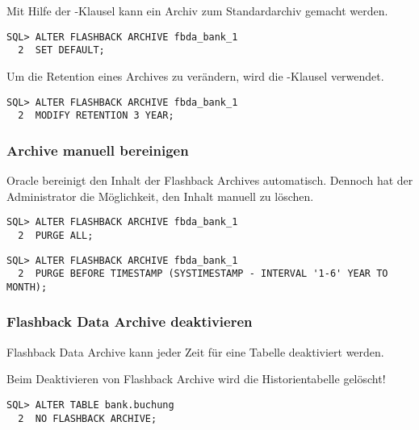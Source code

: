           Mit Hilfe der -Klausel kann ein Archiv zum Standardarchiv gemacht werden.
          \begin{lstlisting}[caption={Ein Archiv zum Standardarchiv machen},label=admin1738,language=oracle_sql]
SQL> ALTER FLASHBACK ARCHIVE fbda_bank_1
  2  SET DEFAULT;
          \end{lstlisting}
          Um die Retention eines Archives zu ver\"andern, wird die -Klausel verwendet.
          \begin{lstlisting}[caption={Die Vorhaltedauer eines Archives ver\"andern},label=admin1739,language=oracle_sql]
SQL> ALTER FLASHBACK ARCHIVE fbda_bank_1
  2  MODIFY RETENTION 3 YEAR;
          \end{lstlisting}
        \subsubsection{Archive manuell bereinigen}
          Oracle bereinigt den Inhalt der Flashback Archives automatisch. Dennoch hat der Administrator die M\"oglichkeit, den Inhalt manuell zu l\"oschen.
          \begin{lstlisting}[caption={Den gesamten Inhalt eines Archives l\"oschen},label=admin1740,language=oracle_sql]
SQL> ALTER FLASHBACK ARCHIVE fbda_bank_1
  2  PURGE ALL;
          \end{lstlisting}
          \begin{lstlisting}[caption={Alle Eintr\"age l\"oschen, die \"alter als ein Jahr und sechs Monate sind},label=admin1741,language=oracle_sql]
SQL> ALTER FLASHBACK ARCHIVE fbda_bank_1
  2  PURGE BEFORE TIMESTAMP (SYSTIMESTAMP - INTERVAL '1-6' YEAR TO MONTH);
          \end{lstlisting}
        \subsubsection{Flashback Data Archive deaktivieren}
          Flashback Data Archive kann jeder Zeit f\"ur eine Tabelle deaktiviert werden.
          \begin{merke}
            Beim Deaktivieren von Flashback Archive wird die Historientabelle gel\"oscht!
          \end{merke}
          \begin{lstlisting}[caption={Flashback Data Archive deaktivieren},label=admin1742,language=oracle_sql]
SQL> ALTER TABLE bank.buchung
  2  NO FLASHBACK ARCHIVE;
          \end{lstlisting}

